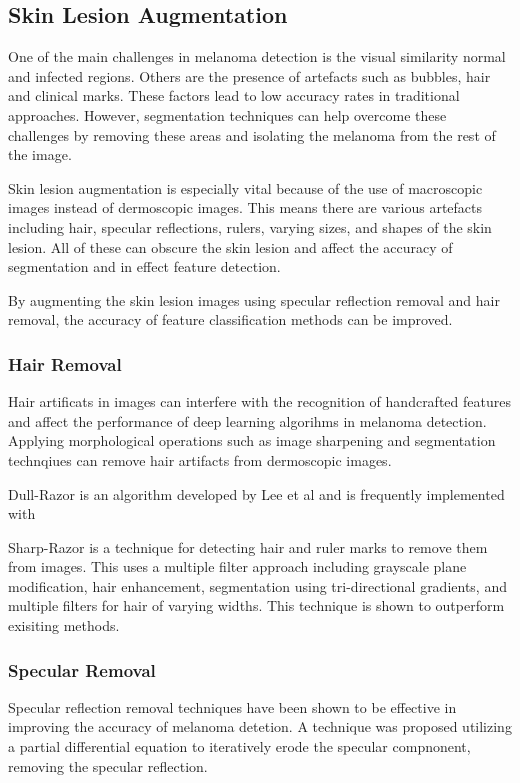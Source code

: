 



\subsection{Skin Lesion Augmentation}
One of the main challenges in melanoma detection is the visual similarity normal and infected regions. Others are the presence of artefacts such as bubbles, hair and clinical marks\cite{Albahli2020}. These factors lead to low accuracy rates in traditional approaches. However, segmentation techniques can help overcome these challenges by removing these areas and isolating the melanoma from the rest of the image.

Skin lesion augmentation is especially vital because of the use of macroscopic images instead of dermoscopic images. This means there are various artefacts including hair, specular reflections, rulers, varying sizes, and shapes of the skin lesion. All of these can obscure the skin lesion and affect the accuracy of segmentation\cite{Unver2019} and in effect feature detection.

By augmenting the skin lesion images using specular reflection removal and hair removal, the accuracy of feature classification methods can be improved\cite{kasmi2023}. 

\subsubsection{Hair Removal}
Hair artificats in images can interfere with the recognition of handcrafted features and affect the performance of deep learning algorihms in melanoma detection\cite{kasmi2023}. Applying morphological operations such as image sharpening and segmentation technqiues can remove hair artifacts from dermoscopic images\cite{kasmi2023}.

Dull-Razor is an algorithm developed by Lee et al\cite{Lee1997} and is frequently implemented with 

Sharp-Razor\cite{kasmi2023} is a technique for detecting hair and ruler marks to remove them from  images. This uses a multiple filter approach including grayscale plane modification, hair enhancement, segmentation using tri-directional gradients, and multiple filters for hair of varying widths. This technique is shown to outperform exisiting methods.

\subsubsection{Specular Removal}
Specular reflection removal techniques have been shown to be effective in improving the accuracy of melanoma detetion\cite{Shen2009}. A technique was proposed utilizing a partial differential equation to iteratively erode the specular compnonent, removing the specular reflection\cite{Shen2009}.

